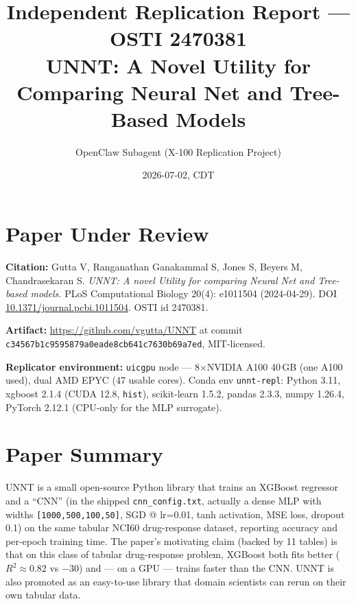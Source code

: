 \documentclass[11pt]{article}
\title{Independent Replication Report --- OSTI 2470381 \\
\large UNNT: A Novel Utility for Comparing Neural Net and Tree-Based Models}
\author{OpenClaw Subagent (X-100 Replication Project)}
\date{2026-07-02, CDT}
\begin{document}
\maketitle

\begin{center}
\end{center}

\section{Paper Under Review}
\textbf{Citation:} Gutta V, Ranganathan Ganakammal S, Jones S, Beyers M, Chandrasekaran S. \emph{UNNT: A novel Utility for comparing Neural Net and Tree-based models.} PLoS Computational Biology 20(4): e1011504 (2024-04-29). DOI \href{https://doi.org/10.1371/journal.pcbi.1011504}{10.1371/journal.pcbi.1011504}. OSTI id 2470381.

\textbf{Artifact:} \url{https://github.com/vgutta/UNNT} at commit \texttt{c34567b1c9595879a0eade8cb641c7630b69a7ed}, MIT-licensed.

\textbf{Replicator environment:} \texttt{uicgpu} node --- 8$\times$NVIDIA A100 40\,GB (one A100 used), dual AMD EPYC (47 usable cores). Conda env \texttt{unnt-repl}: Python 3.11, xgboost 2.1.4 (CUDA 12.8, \texttt{hist}), scikit-learn 1.5.2, pandas 2.3.3, numpy 1.26.4, PyTorch 2.12.1 (CPU-only for the MLP surrogate).

\section{Paper Summary}
UNNT is a small open-source Python library that trains an XGBoost regressor and a ``CNN'' (in the shipped \texttt{cnn\_config.txt}, actually a dense MLP with widths \texttt{[1000,500,100,50]}, SGD @ lr=0.01, tanh activation, MSE loss, dropout 0.1) on the same tabular NCI60 drug-response dataset, reporting accuracy and per-epoch training time. The paper's motivating claim (backed by 11 tables) is that on this class of tabular drug-response problem, XGBoost both fits better ($R^2 \approx 0.82$ vs $-30$) and --- on a GPU --- trains faster than the CNN. UNNT is also promoted as an easy-to-use library that domain scientists can rerun on their own tabular data.
\end{document}
